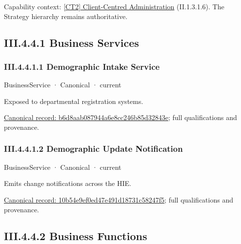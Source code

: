 {\small Capability context: \hyperref[element:8752b7a937754b2faa296300c6a48911]{[CT2] Client-Centred Administration} (II.1.3.1.6). The Strategy hierarchy remains authoritative.}\par
\subsection*{III.4.4.1 Business Services}
\label{navigation:III.4.4.1}

\subsubsection*{III.4.4.1.1 Demographic Intake Service}
\label{navigation:III.4.4.1.1}

\label{element:b6d8aab087944a6e8cc246b85d32843e}
{\small BusinessService · Canonical · current}\par

Exposed to departmental registration systems.


{\footnotesize \href{../../../../continuum/business/business-service/b6d8aab087944a6e8cc246b85d32843e.md}{Canonical record: b6d8aab087944a6e8cc246b85d32843e}; full qualifications and provenance.}\par
\subsubsection*{III.4.4.1.2 Demographic Update Notification}
\label{navigation:III.4.4.1.2}

\label{element:10b54e9ef0ed47e491d18731c58247f5}
{\small BusinessService · Canonical · current}\par

Emits change notifications across the HIE.


{\footnotesize \href{../../../../continuum/business/business-service/10b54e9ef0ed47e491d18731c58247f5.md}{Canonical record: 10b54e9ef0ed47e491d18731c58247f5}; full qualifications and provenance.}\par
\subsection*{III.4.4.2 Business Functions}
\label{navigation:III.4.4.2}

